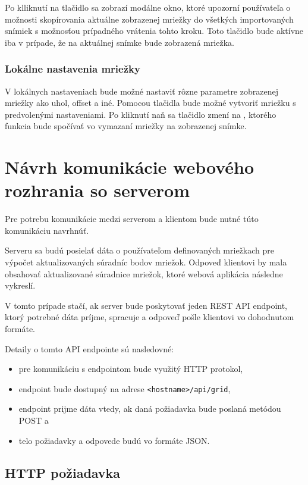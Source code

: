 Po klliknutí na tlačidlo  sa zobrazí modálne okno, ktoré upozorní používateľa o možnosti skopírovania aktuálne zobrazenej mriežky do všetkých importovaných snímiek s možnosťou prípadného vrátenia tohto kroku. Toto tlačidlo bude aktívne iba v prípade, že na aktuálnej snímke bude zobrazená mriežka.

\subsubsection* {Lokálne nastavenia mriežky}
V lokálnych nastaveniach bude možné nastaviť rôzne parametre zobrazenej mriežky ako uhol, offset a iné. Pomocou tlačidla  bude možné vytvoriť mriežku s predvolenými nastaveniami. Po kliknutí naň sa tlačidlo zmení na , ktorého funkcia bude spočívať vo vymazaní mriežky na zobrazenej snímke.

\section {Návrh komunikácie webového rozhrania so serverom}\label{api_endpoint}
Pre potrebu komunikácie medzi serverom a klientom bude nutné túto komunikáciu navrhnúť. 

Serveru sa budú posielať dáta o používateľom definovaných mriežkach pre výpočet aktualizovaných súradníc bodov mriežok. Odpoveď klientovi by mala obsahovať aktualizované súradnice mriežok, ktoré webová aplikácia následne vykreslí.

V tomto prípade stačí, ak server bude poskytovať jeden REST API endpoint, ktorý potrebné dáta príjme, spracuje a odpoveď pošle klientovi vo dohodnutom formáte.

Detaily o tomto API endpointe sú nasledovné:
\begin {itemize}
\item {pre komunikáciu s endpointom bude využitý HTTP protokol,}
\item {endpoint bude dostupný na adrese \texttt{<hostname>/api/grid},}
\item {endpoint prijme dáta vtedy, ak daná požiadavka bude poslaná metódou POST a}
\item {telo požiadavky a odpovede budú vo formáte JSON.}
\end {itemize}

\clearpage

\subsection {HTTP požiadavka}

